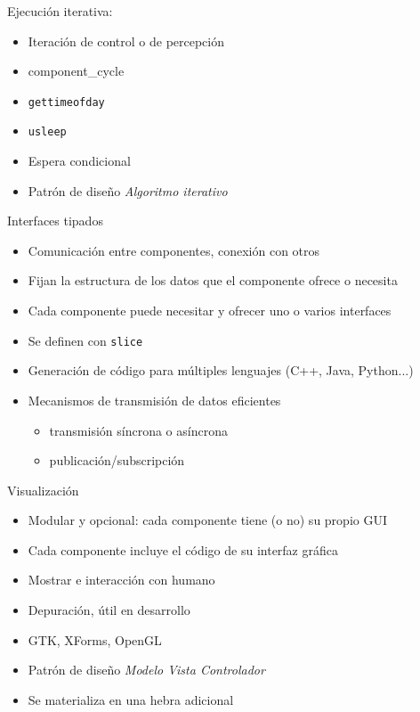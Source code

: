 \documentclass[twocolumn]{svjour3}          %
\begin{document}
Ejecución iterativa:
\begin{itemize}
\item Iteración de control o de percepción
\item component\_cycle 
\item \texttt{gettimeofday}
\item \texttt{usleep}
\item Espera condicional
\item Patrón de diseño \textit{Algoritmo iterativo}
\end{itemize}

Interfaces tipados
\begin{itemize}
\item {Comunicación entre componentes}, conexión con otros 
\item Fijan la estructura de los datos que el componente ofrece o necesita
\item Cada componente puede necesitar y ofrecer uno o varios interfaces 
\item Se definen con \texttt{slice}
\item Generación de código para múltiples lenguajes (C++, Java, Python...)
\item Mecanismos de transmisión de datos eficientes
\begin{itemize}
\item transmisión síncrona o asíncrona
\item publicación/subscripción
\end{itemize}
\end{itemize}


Visualización
\begin{itemize}
\item {Modular} y {opcional}: cada componente tiene (o no) su propio GUI
\item Cada componente incluye el código de su interfaz gráfica
\item Mostrar e interacción con humano 
\item Depuración, útil en desarrollo
\item GTK, XForms, OpenGL
\item Patrón de diseño \textit{Modelo Vista Controlador}
\item Se materializa en una {hebra adicional}
\end{itemize}
\end{document}
